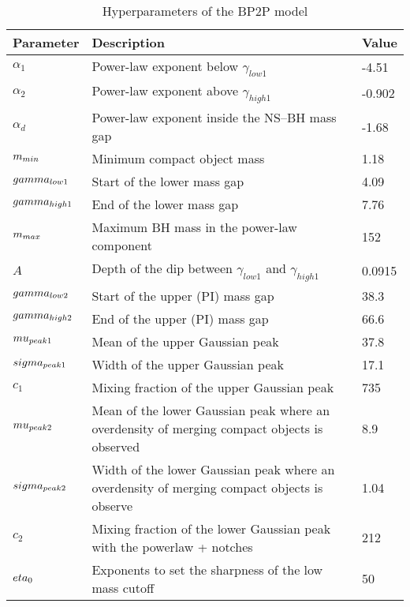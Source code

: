\begin{table}[ht]
\centering
\caption{Hyperparameters of the BP2P model}
\begin{tabular}{lll}
\hline
Parameter & Description & Value\\
\hline
$\alpha_1$ & Power-law exponent below $\gamma_{low1}$ & -4.51 \\
$\alpha_2$ & Power-law exponent above $\gamma_{high1}$ & -0.902 \\
$\alpha_d$ & Power-law exponent inside the NS–BH mass gap & -1.68 \\
$m_{\\min}$ & Minimum compact object mass & 1.18 \\
$\\gamma_{low1}$ & Start of the lower mass gap & 4.09 \\
$\\gamma_{high1}$ & End of the lower mass gap & 7.76 \\
$m_{\\max}$ & Maximum BH mass in the power-law component & 152 \\
$A$ & Depth of the dip between $\gamma_{low1}$ and $\gamma_{high1}$ & 0.0915 \\
$\\gamma_{low2}$ & Start of the upper (PI) mass gap & 38.3 \\
$\\gamma_{high2}$ & End of the upper (PI) mass gap & 66.6 \\
$\\mu_{peak1}$ & Mean of the upper Gaussian peak & 37.8 \\
$\\sigma_{peak1}$ & Width of the upper Gaussian peak & 17.1 \\
$c_1$ & Mixing fraction of the upper Gaussian peak & 735 \\
$\\mu_{peak2}$ & Mean of the lower Gaussian peak where an overdensity of merging compact objects is observed & 8.9 \\
$\\sigma_{peak2}$ & Width of the lower Gaussian peak where an overdensity of merging compact objects is observe & 1.04 \\
$c_2$ & Mixing fraction of the lower Gaussian peak with the powerlaw + notches & 212 \\
$\\eta_0$ & Exponents to set the sharpness of the low mass cutoff & 50 \\

\end{tabular}
\end{table}
